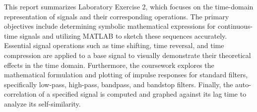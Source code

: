 This report summarizes Laboratory Exercise 2, which focuses on the time-domain representation of signals and their corresponding operations. The primary objectives include determining symbolic mathematical expressions for continuous-time signals and utilizing MATLAB to sketch these sequences accurately. Essential signal operations such as time shifting, time reversal, and time compression are applied to a base signal to visually demonstrate their theoretical effects in the time domain. Furthermore, the coursework explores the mathematical formulation and plotting of impulse responses for standard filters, specifically low-pass, high-pass, bandpass, and bandstop filters. Finally, the auto-correlation of a specified signal is computed and graphed against its lag time to analyze its self-similarity.